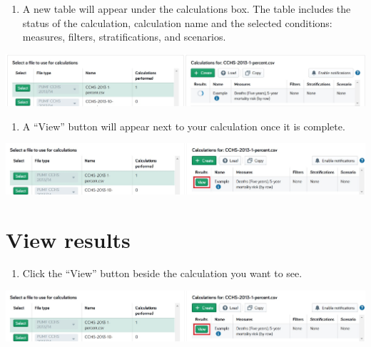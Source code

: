 \documentclass[]{book}
\providecommand{\tightlist}{%
  \setlength{\itemsep}{0pt}\setlength{\parskip}{0pt}}
\begin{document}
\begin{enumerate}
\def\labelenumi{\arabic{enumi}.}
\setcounter{enumi}{1}
\tightlist
\item
  A new table will appear under the calculations box. The table includes
  the status of the calculation, calculation name and the selected
  conditions: measures, filters, stratifications, and scenarios.
\end{enumerate}

\begin{center}\includegraphics{Images/Calculate2} \end{center}

\begin{enumerate}
\def\labelenumi{\arabic{enumi}.}
\setcounter{enumi}{2}
\tightlist
\item
  A ``View'' button will appear next to your calculation once it is
  complete.
\end{enumerate}

\begin{center}\includegraphics{Images/Calculate3} \end{center}

\section{View results}\label{view-results}

\begin{enumerate}
\def\labelenumi{\arabic{enumi}.}
\tightlist
\item
  Click the ``View'' button beside the calculation you want to see.
\end{enumerate}

\begin{center}\includegraphics{Images/Calculate3} \end{center}
\end{document}
